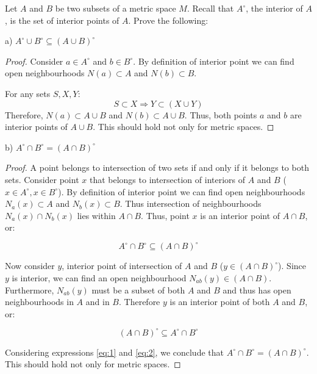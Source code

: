 \documentclass{article}
\begin{document}
\begin{tcolorbox}
Let $A$ and $B$ be two subsets of a metric space $M$. Recall that $A^\circ$, the interior of $A$, is
the set of interior points of $A$. Prove the following:

a) $A^\circ \cup B^\circ \subseteq (A \cup B)^\circ $
\end{tcolorbox}

\begin{proof}
Consider $a \in A^\circ$ and $b \in B^\circ$. By definition of interior point we can find open neighbourhoods $N(a) \subset A$ and $N(b) \subset B$.

For any sets $S, X, Y$:
$$ S \subset X \Rightarrow Y \subset (X \cup Y) $$
Therefore, $N(a) \subset A \cup B$ and $N(b) \subset A \cup B$. Thus, both points $a$ and $b$ are interior points of $A \cup B$. This should hold not only for metric spaces.
\end{proof}

\begin{tcolorbox}
b) $ A^\circ \cap B^\circ = (A \cap B)^\circ $
\end{tcolorbox}

\begin{proof}
A point belongs to intersection of two sets if and only if it belongs to both sets. Consider point $x$ that belongs to intersection of interiors of $A$ and $B$ ($x \in A^\circ, x \in B^\circ$). By definition of interior point we can find open neighbourhoods $N_a(x) \subset A$ and $N_b(x) \subset B$. Thus intersection of neighbourhoods $N_a(x) \cap N_b(x)$ lies within $A \cap B$. Thus, point $x$ is an interior point of $A \cap B$, or:

\begin{equation} \label{eq:1}
A^\circ \cap B^\circ \subseteq (A \cap B)^\circ
\end{equation}

Now consider $y$, interior point of intersection of $A$ and $B$ ($y \in (A \cap B)^\circ$). Since $y$ is interior, we can find an open neighbourhood $N_{ab}(y) \in (A \cap B)$. Furthermore, $N_{ab}(y)$ must be a subset of both $A$ and $B$ and thus has open neighbourhoods in $A$ and in $B$. Therefore $y$ is an interior point of both $A$ and $B$, or:

\begin{equation} \label{eq:2}
(A \cap B)^\circ \subseteq A^\circ \cap B^\circ
\end{equation}

Considering expressions \ref{eq:1} and \ref{eq:2}, we conclude that $ A^\circ \cap B^\circ = (A \cap B)^\circ $. This should hold not only for metric spaces.
\end{proof}
\end{document}
